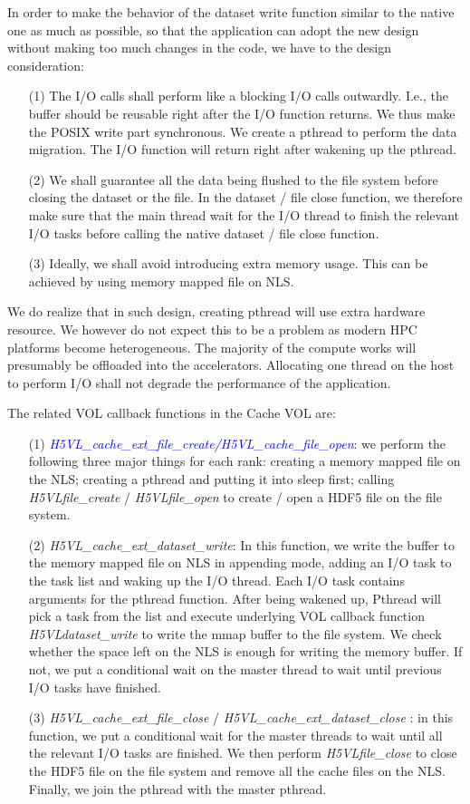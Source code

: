 \documentclass[aps, rmp, 11pt, notitlepage]{revtex4-1}
\def\function#1{\textcolor{blue}{{\it #1}}}
\begin{document}
In order to make the behavior of the dataset write function similar to the native one as much as possible, so that the application can adopt the new design without making too much changes in the code, we have to the design consideration: 
\begin{itemize}
\item [(1)] The I/O calls shall perform like a blocking I/O calls outwardly. I.e., the buffer should be reusable right after the I/O function returns. We thus make the POSIX write part synchronous. We create a pthread to perform the data migration. The I/O function will return right after wakening up the pthread. 
\item [(2)] We shall guarantee all the data being flushed to the file system before closing the dataset or the file. In the dataset / file close function, we therefore make sure that the main thread wait for the I/O thread to finish the relevant I/O tasks before calling the native dataset / file close function. 
\item [(3)] Ideally, we shall avoid introducing extra memory usage. This can be achieved by using memory mapped file on NLS.
\end{itemize}
We do realize that in such design, creating pthread will use extra hardware resource. We however do not expect this to be a problem as modern HPC platforms become heterogeneous. The majority of the compute works will presumably be offloaded into the accelerators. Allocating one thread on the host to perform I/O shall not degrade the performance of the application. 

The related VOL callback functions in the Cache VOL are: 
\begin{itemize}
\item [(1)] \function{H5VL\_cache\_ext\_file\_create/H5VL\_cache\_file\_open}: we perform the following three major things for each rank: creating a memory mapped file on the NLS; creating a pthread and putting it into sleep first; calling \textit{H5VLfile\_create} / \textit{H5VLfile\_open} to create / open a HDF5 file on the file system. 
\item [(2)] {\it H5VL\_cache\_ext\_dataset\_write}: In this function, we write the buffer to the memory mapped file on NLS in appending mode, adding an I/O task to the task list and waking up the I/O thread. Each I/O task contains arguments for the pthread function. After being wakened up, Pthread will pick a task from the list and execute underlying VOL callback function \textit{H5VLdataset\_write} to write the mmap buffer to the file system. We check whether the space left on the NLS is enough for writing the memory buffer. If not, we put a conditional wait on the master thread to wait until previous I/O tasks have finished. 
\item [(3)]{\it H5VL\_cache\_ext\_file\_close} / {\it H5VL\_cache\_ext\_dataset\_close} : in this function, we put a conditional wait for the master threads to wait until all the relevant I/O tasks are finished. We then perform \textit{H5VLfile\_close} to close the HDF5 file on the file system and remove all the cache files on the NLS. Finally, we join the pthread with the master pthread. 
\end{itemize}
\end{document}
